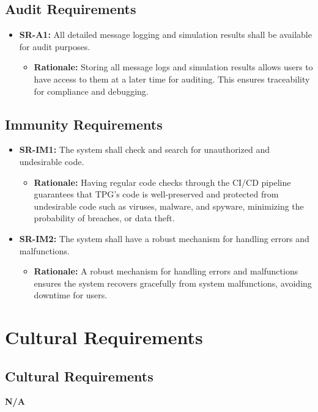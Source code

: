 \documentclass[12pt]{article}
\begin{document}
\subsection{Audit Requirements}
\begin{itemize}
  \item \textbf{SR-A1:} All detailed message logging and simulation results shall be available for audit purposes.
  \begin{itemize}
    \item \textbf{Rationale:} Storing all message logs and simulation results allows users to have access to them at a later time for auditing. This ensures traceability for compliance and debugging.
  \end{itemize}
\end{itemize}

\subsection{Immunity Requirements}
\begin{itemize}
  \item \textbf{SR-IM1:} The system shall check and search for unauthorized and undesirable code.
  \begin{itemize}
    \item \textbf{Rationale:} Having regular code checks through the CI/CD pipeline guarantees that TPG's code is well-preserved and protected from undesirable code such as viruses, malware, and spyware, minimizing the probability of breaches, or data theft.
  \end{itemize}
  \item \textbf{SR-IM2:} The system shall have a robust mechanism for handling errors and malfunctions.
  \begin{itemize}
    \item \textbf{Rationale:} A robust mechanism for handling errors and malfunctions ensures the system recovers gracefully from system malfunctions, avoiding downtime for users.
  \end{itemize}
\end{itemize}

\section{Cultural Requirements}




\subsection{Cultural Requirements}
\textbf{N/A}
\end{document}
